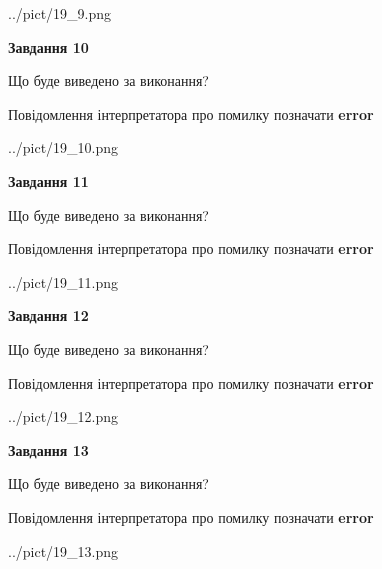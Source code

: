 \documentclass[11pt, ukrainian]{article}
\begin{document}
{\begin {large}
\begin{center}
	{../pict/19_9.png}
\end{center}
\newpage

{\begin {center}\textbf{Завдання 10}\end {center}}\par
Що буде виведено за виконання? \par
Повідомлення інтерпретатора про помилку позначати \textbf{error}

\begin{center}
	{../pict/19_10.png}
\end{center}
\newpage

{\begin {center}\textbf{Завдання 11}\end {center}}\par
Що буде виведено за виконання? \par
Повідомлення інтерпретатора про помилку позначати \textbf{error}

\begin{center}
	{../pict/19_11.png}
\end{center}
\newpage

{\begin {center}\textbf{Завдання 12}\end {center}}\par
Що буде виведено за виконання? \par
Повідомлення інтерпретатора про помилку позначати \textbf{error}

\begin{center}
	{../pict/19_12.png}
\end{center}
\newpage

{\begin {center}\textbf{Завдання 13}\end {center}}\par
Що буде виведено за виконання? \par
Повідомлення інтерпретатора про помилку позначати \textbf{error}

\begin{center}
	{../pict/19_13.png}
\end{center}
\newpage


\end{large}}
\end{document}
